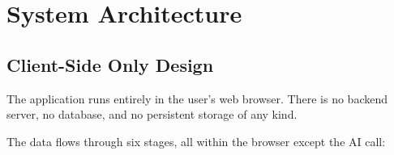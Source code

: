 \documentclass[11pt,letterpaper]{article}
\begin{document}
\vspace{10pt}

\section{System Architecture}

\subsection{Client-Side Only Design}

The application runs entirely in the user's web browser. There is no backend server, no database, and no persistent storage of any kind.

\noindent The data flows through six stages, all within the browser except the AI call:
\end{document}
